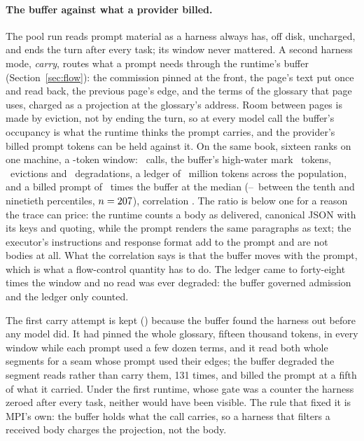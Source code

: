 \paragraph{The buffer against what a provider billed.} The pool run reads
prompt material as a harness always has, off disk, uncharged, and ends the
turn after every task; its window never mattered. A second harness mode,
\emph{carry}, routes what a prompt needs through the runtime's buffer
(Section~\ref{sec:flow}): the commission pinned at the front, the page's text
put once and read back, the previous page's edge, and the terms of the
glossary that page uses, charged as a projection at the glossary's address.
Room between pages is made by eviction, not by ending the turn, so at every
model call the buffer's occupancy is what the runtime thinks the prompt
carries, and the provider's billed prompt tokens can be held against it. On
the same book, sixteen ranks on one machine, a \eEightBufferBudget-token
window: \eEightBufferCalls\ calls, the buffer's high-water mark
\eEightBufferHighWater\ tokens, \eEightBufferEvictions\ evictions and
\eEightBufferDegradations\ degradations, a ledger of \eEightBufferLedgerM\
million tokens across the population, and a billed prompt of
\eEightBufferRatioBilled\ times the buffer at the median
(\eEightBufferRatioBilledLo--\eEightBufferRatioBilledHi\ between the tenth and
ninetieth percentiles, $n=207$), correlation
\eEightBufferCorrelation. The ratio is below one for a reason the trace can
price: the runtime counts a body as delivered, canonical JSON with its keys and
quoting, while the prompt renders the same paragraphs as text; the executor's
instructions and response format add to the prompt and are not bodies at all.
What the correlation says is that the buffer moves with the prompt, which is
what a flow-control quantity has to do. The ledger came to forty-eight times
the window and no read was ever degraded: the buffer governed admission and
the ledger only counted.

The first carry attempt is kept ()
because the buffer found the harness out before any model did. It had pinned
the whole glossary, fifteen thousand tokens, in every window while each prompt
used a few dozen terms, and it read both whole segments for a seam whose
prompt used their edges; the buffer degraded the segment reads rather than
carry them, 131 times, and billed the prompt at a fifth of what it carried.
Under the first runtime, whose gate was a counter the harness zeroed after
every task, neither would have been visible. The rule that fixed it is MPI's
own: the buffer holds what the call carries, so a harness that filters a
received body charges the projection, not the body.
